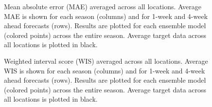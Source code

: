 \documentclass[
]{article}
\begin{document}
\begin{figure}


\caption{\label{fig-mae-vs-forecast-date}Mean absolute error (MAE)
averaged across all locations. Average MAE is shown for each season
(columns) and for 1-week and 4-week ahead forecasts (rows). Results are
plotted for each ensemble model (colored points) across the entire
season. Average target data across all locations is plotted in black.}

\end{figure}%

\begin{figure}


\caption{\label{fig-wis-vs-forecast-date}Weighted interval score (WIS)
averaged across all locations. Average WIS is shown for each season
(columns) and for 1-week and 4-week ahead forecasts (rows). Results are
plotted for each ensemble model (colored points) across the entire
season. Average target data across all locations is plotted in black.}

\end{figure}%
\end{document}
